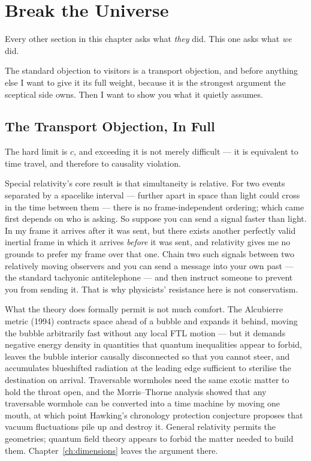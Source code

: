 \section{Break the Universe}\label{sec:breakuniverse}

Every other section in this chapter asks what \emph{they} did. This one asks what \emph{we} did.

The standard objection to visitors is a transport objection, and before anything else I want to give
it its full weight, because it is the strongest argument the sceptical side owns. Then I want to show
you what it quietly assumes.

\subsection{The Transport Objection, In Full}\label{sub:transportobjection}

The hard limit is $c$, and exceeding it is not merely difficult --- it is equivalent to time travel,
and therefore to causality violation.


Special relativity's core result is that simultaneity is relative. For two events separated by a
spacelike interval --- further apart in space than light could cross in the time between them ---
there is no frame-independent ordering; which came first depends on who is asking. So suppose you can
send a signal faster than light. In my frame it arrives after it was sent, but there exists another
perfectly valid inertial frame in which it arrives \emph{before} it was sent, and relativity gives me
no grounds to prefer my frame over that one. Chain two such signals between two relatively moving
observers and you can send a message into your own past --- the standard tachyonic antitelephone ---
and then instruct someone to prevent you from sending it.  That is why physicists' resistance here is not
conservatism.

What the theory does formally permit is not much comfort. The Alcubierre metric (1994) contracts space
ahead of a bubble and expands it behind, moving the bubble arbitrarily fast without any local FTL
motion --- but it demands negative energy density in quantities that quantum inequalities appear to
forbid, leaves the bubble interior causally disconnected so that you cannot steer, and accumulates
blueshifted radiation at the leading edge sufficient to sterilise the destination on arrival.
Traversable wormholes need the same exotic matter to hold the throat open, and the Morris--Thorne
analysis showed that any traversable wormhole can be converted into a time machine by moving one
mouth, at which point Hawking's chronology protection conjecture proposes that vacuum fluctuations
pile up and destroy it. General relativity permits the geometries; quantum field theory appears to
forbid the matter needed to build them. Chapter~\ref{ch:dimensions} leaves the argument there.

